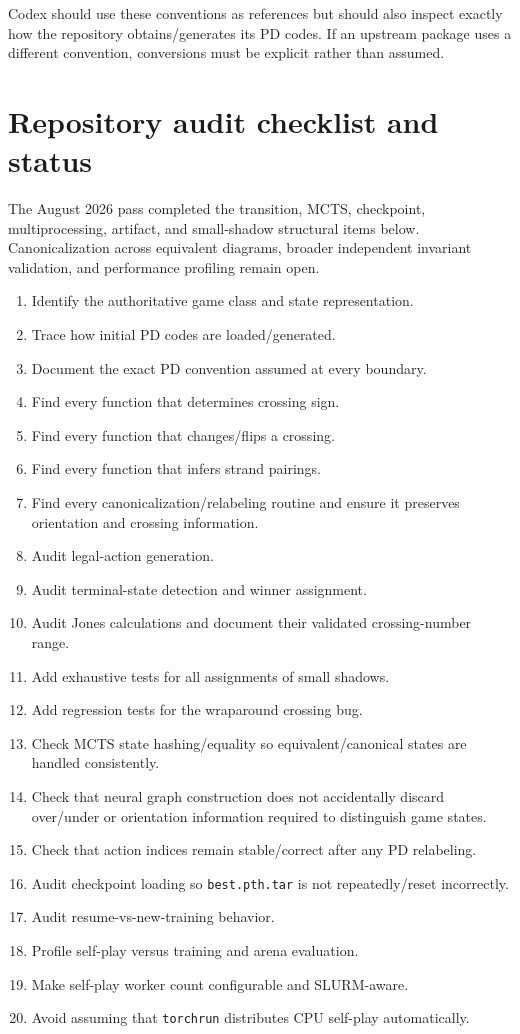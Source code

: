 \documentclass[11pt]{article}
\begin{document}
Codex should use these conventions as references but should also inspect exactly how the repository obtains/generates its PD codes. If an upstream package uses a different convention, conversions must be explicit rather than assumed.

\section{Repository audit checklist and status}

The August 2026 pass completed the transition, MCTS, checkpoint, multiprocessing, artifact, and small-shadow structural items below. Canonicalization across equivalent diagrams, broader independent invariant validation, and performance profiling remain open.

\begin{enumerate}[label=\arabic*.]
    \item Identify the authoritative game class and state representation.
    \item Trace how initial PD codes are loaded/generated.
    \item Document the exact PD convention assumed at every boundary.
    \item Find every function that determines crossing sign.
    \item Find every function that changes/flips a crossing.
    \item Find every function that infers strand pairings.
    \item Find every canonicalization/relabeling routine and ensure it preserves orientation and crossing information.
    \item Audit legal-action generation.
    \item Audit terminal-state detection and winner assignment.
    \item Audit Jones calculations and document their validated crossing-number range.
    \item Add exhaustive tests for all assignments of small shadows.
    \item Add regression tests for the wraparound crossing bug.
    \item Check MCTS state hashing/equality so equivalent/canonical states are handled consistently.
    \item Check that neural graph construction does not accidentally discard over/under or orientation information required to distinguish game states.
    \item Check that action indices remain stable/correct after any PD relabeling.
    \item Audit checkpoint loading so \texttt{best.pth.tar} is not repeatedly/reset incorrectly.
    \item Audit resume-vs-new-training behavior.
    \item Profile self-play versus training and arena evaluation.
    \item Make self-play worker count configurable and SLURM-aware.
    \item Avoid assuming that \texttt{torchrun} distributes CPU self-play automatically.
\end{enumerate}
\end{document}
